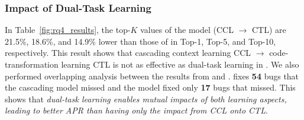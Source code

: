 



\subsubsection{\bf Impact of Dual-Task Learning}
\label{ccl:sec}

In Table~\ref{fig:rq4_results}, the top-$K$ values of the
 model (CCL $\rightarrow$ CTL) are 21.5\%, 18.6\%, and
14.9\% lower than those of {\tool} in Top-1, Top-5, and Top-10,
respectively. This result shows that cascading context learning CCL
$\rightarrow$ code-transformation learning CTL is not as effective as
dual-task learning in {\tool}. We also performed overlapping analysis
between the results from {\tool} and . {\tool} fixes {\bf 54} bugs that the cascading model missed and
the  model fixed only {\bf 17} bugs that {\tool}
missed. This shows that {\em dual-task learning enables mutual impacts
  of both learning aspects, leading to better APR than having only the
  impact from CCL onto CTL}.



